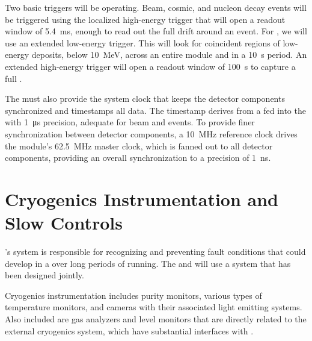Two basic triggers will be operating. Beam, cosmic, and nucleon decay events will be triggered using the localized high-energy trigger 
that will open a readout window of \SI{5.4}{\ms}, enough to read out the full  drift around an event. For , we will use an extended low-energy trigger. This will look for coincident regions of low-energy deposits, below \SI{10}{\mega\electronvolt}, across an entire module and in a \SI{10}{\second} period. An extended high-energy trigger will open a readout window of \SI{100}{\second} to capture a full . 

The  must also provide the system clock that keeps the detector components synchronized and %
timestamps all data. The timestamp derives from a   fed into the  with \SI{1}{\micro\second} precision, adequate %
for beam and  events. To provide finer synchronization between detector components, a \SI{10}{\mega\hertz} reference clock drives the module's \SI{62.5}{\mega\hertz} master clock, which is fanned out to all detector components, providing an overall synchronization to a precision of \SI{1}{\nano\second}.



\section{Cryogenics Instrumentation and Slow Controls}
\label{sec:dp-execsum-sc}


's  system is responsible for recognizing and preventing fault conditions that could develop in a  over long periods of running. 
The  and  will use a  system that has been designed jointly.

Cryogenics instrumentation includes purity monitors,  various types of temperature monitors, and cameras with their associated light emitting systems. Also included are %
gas analyzers and  level monitors that are directly related to the external cryogenics system, which have substantial interfaces with . %

